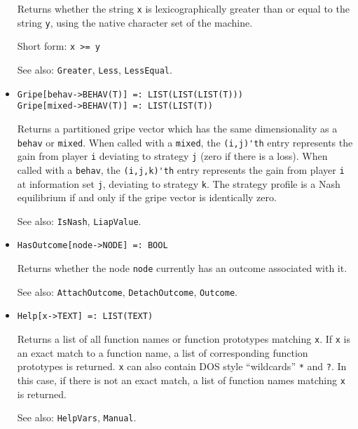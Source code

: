 \begin{itemize}
\bd
Returns whether the string \verb+x+ is lexicographically greater than
or equal to the string \verb+y+, using the native character set of the
machine.
\item
[Short form:] \verb+x >= y+
\item
[See also:] {\tt Greater}, {\tt Less}, {\tt LessEqual}.
\ed

\item
\protect \large \begin{verbatim}
Gripe[behav->BEHAV(T)] =: LIST(LIST(LIST(T)))
Gripe[mixed->BEHAV(T)] =: LIST(LIST(T))
\end{verbatim}\normalsize

\bd 
Returns a partitioned gripe vector which has the same
dimensionality as a \verb+behav+ or \verb+mixed+.  When called with a
\verb+mixed+, the \verb+(i,j)'th+ entry represents the gain from
player \verb+i+ deviating to strategy \verb+j+ (zero if there is a
loss).  When called with a \verb+behav+, the \verb+(i,j,k)'th+ entry
represents the gain from player \verb+i+ at information set \verb+j+,
deviating to strategy \verb+k+.  The strategy profile is a Nash
equilibrium if and only if the gripe vector is identically zero.  
\item
[See also:] {\tt IsNash}, {\tt LiapValue}.  
\ed



\item
\protect \large \begin{verbatim}
HasOutcome[node->NODE] =: BOOL
\end{verbatim} \normalsize

\bd
Returns whether the node \verb+node+ currently has an outcome associated
with it.
\item
[See also:] {\tt AttachOutcome}, {\tt DetachOutcome}, {\tt Outcome}.
\ed

\item
\protect \large \begin{verbatim}
Help[x->TEXT] =: LIST(TEXT)
\end{verbatim}\normalsize

\bd 
Returns a list of all function names or function prototypes
matching \verb+x+.  If \verb+x+ is an exact match to a function name,
a list of corresponding function prototypes is returned.  \verb+x+ can
also contain DOS style ``wildcards'' \verb+*+ and \verb+?+.  In this
case, if there is not an exact match, a list of function names
matching \verb+x+ is returned.
\item
[See also:] {\tt HelpVars}, {\tt Manual}.  
\ed


\end{itemize}
